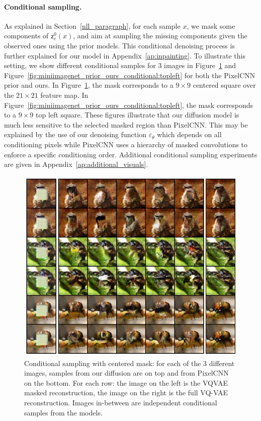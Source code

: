 \documentclass[nolayout]{article}
\theoremstyle{plain}
\theoremstyle{definition}
\theoremstyle{remark}
\newcommand{\latentcont}{\mathsf{z}_e}
\begin{document}
\paragraph{Conditional sampling. }
As explained in Section~\ref{nll_paragraph},  for each sample $x$,  we mask some components of $\latentcont^0(x)$, and aim at sampling the missing components given the observed ones using the prior models. This conditional denoising process is further explained for our model in Appendix~\ref{ap:inpainting}. To illustrate this setting, we show different conditional samples for 3 images in Figure~\ref{fig:miniimagenet_prior_ours_conditional} and  Figure~\ref{fig:miniimagenet_prior_ours_conditional:topleft}  for both the PixelCNN prior and ours. In Figure~\ref{fig:miniimagenet_prior_ours_conditional},  the mask corresponds to a $9\times 9$ centered square over the $21\times 21$ feature map. In Figure~\ref{fig:miniimagenet_prior_ours_conditional:topleft},  the mask corresponds to a $9\times 9$ top left square. These figures illustrate that our diffusion model is much less sensitive to the selected masked region than PixelCNN. This may be explained by the use of our denoising function $\varepsilon_\theta$ which depends on all conditioning pixels while PixelCNN uses a hierarchy of masked convolutions to enforce
a specific conditioning order. Additional conditional sampling experiments are given in Appendix~\ref{ap:additional_visuals}.

\begin{figure}
    \centering
    \includegraphics[width=\linewidth]{images/ours/cond_samples_center_2.png}

    \caption{Conditional sampling with centered mask: for each of the 3 different images, samples from our diffusion are on top and from PixelCNN on the bottom. For each row: the image on the left is the VQVAE masked reconstruction, the image on the right is the full VQ-VAE reconstruction. Images in-between are independent conditional samples from the models.}
    \label{fig:miniimagenet_prior_ours_conditional}
\end{figure}
\end{document}
